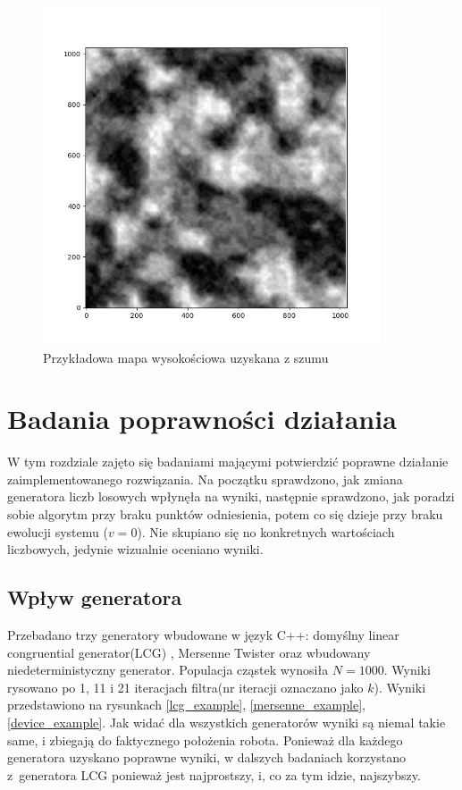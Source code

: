 \begin{figure}[H]
\begin{center}
	\includegraphics[width=10cm]{./przykladowa_mapa_szumu.png}
	\caption{Przykładowa mapa wysokościowa uzyskana z szumu}
	\label{przykladowa_mapa_szumu}
\end{center}
\end{figure}

\section{Badania poprawności działania}
W tym rozdziale zajęto się badaniami mającymi potwierdzić poprawne działanie zaimplementowanego rozwiązania. Na początku sprawdzono, jak zmiana generatora liczb losowych wpłynęła na wyniki, następnie sprawdzono, jak poradzi sobie algorytm przy braku punktów odniesienia, potem co się dzieje przy braku ewolucji systemu ($v=0$). Nie skupiano się no konkretnych wartościach liczbowych, jedynie wizualnie oceniano wyniki.

\subsection{Wpływ generatora}
Przebadano trzy generatory wbudowane w język C++: domyślny linear congruential generator(LCG) \cite{lcg_wiki}, Mersenne Twister \cite{mersenne_wiki} oraz wbudowany niedeterministyczny generator. Populacja cząstek wynosiła $N=1000$. Wyniki rysowano po 1, 11 i 21 iteracjach filtra(nr iteracji oznaczano jako $k$). Wyniki przedstawiono na rysunkach \ref{lcg_example}, \ref{mersenne_example}, \ref{device_example}. Jak widać dla wszystkich generatorów wyniki są niemal takie same, i zbiegają do faktycznego położenia robota. Ponieważ dla każdego generatora uzyskano poprawne wyniki, w dalszych badaniach korzystano z~generatora LCG ponieważ jest najprostszy, i, co za tym idzie, najszybszy.

